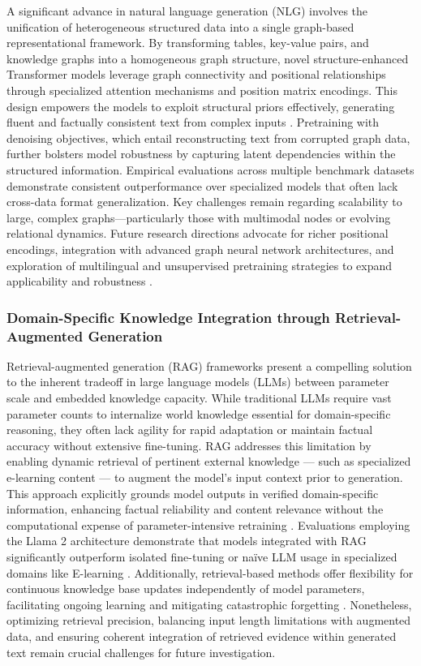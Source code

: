 \documentclass[sigconf]{acmart}
\begin{document}
A significant advance in natural language generation (NLG) involves the unification of heterogeneous structured data into a single graph-based representational framework. By transforming tables, key-value pairs, and knowledge graphs into a homogeneous graph structure, novel structure-enhanced Transformer models leverage graph connectivity and positional relationships through specialized attention mechanisms and position matrix encodings. This design empowers the models to exploit structural priors effectively, generating fluent and factually consistent text from complex inputs \cite{ref46}. Pretraining with denoising objectives, which entail reconstructing text from corrupted graph data, further bolsters model robustness by capturing latent dependencies within the structured information. Empirical evaluations across multiple benchmark datasets demonstrate consistent outperformance over specialized models that often lack cross-data format generalization. Key challenges remain regarding scalability to large, complex graphs---particularly those with multimodal nodes or evolving relational dynamics. Future research directions advocate for richer positional encodings, integration with advanced graph neural network architectures, and exploration of multilingual and unsupervised pretraining strategies to expand applicability and robustness \cite{ref46}.

\subsubsection{Domain-Specific Knowledge Integration through Retrieval-Augmented Generation}

Retrieval-augmented generation (RAG) frameworks present a compelling solution to the inherent tradeoff in large language models (LLMs) between parameter scale and embedded knowledge capacity. While traditional LLMs require vast parameter counts to internalize world knowledge essential for domain-specific reasoning, they often lack agility for rapid adaptation or maintain factual accuracy without extensive fine-tuning. RAG addresses this limitation by enabling dynamic retrieval of pertinent external knowledge --- such as specialized e-learning content --- to augment the model’s input context prior to generation. This approach explicitly grounds model outputs in verified domain-specific information, enhancing factual reliability and content relevance without the computational expense of parameter-intensive retraining \cite{ref8}. Evaluations employing the Llama 2 architecture demonstrate that models integrated with RAG significantly outperform isolated fine-tuning or naïve LLM usage in specialized domains like E-learning \cite{ref49}. Additionally, retrieval-based methods offer flexibility for continuous knowledge base updates independently of model parameters, facilitating ongoing learning and mitigating catastrophic forgetting \cite{ref49}. Nonetheless, optimizing retrieval precision, balancing input length limitations with augmented data, and ensuring coherent integration of retrieved evidence within generated text remain crucial challenges for future investigation.
\end{document}
